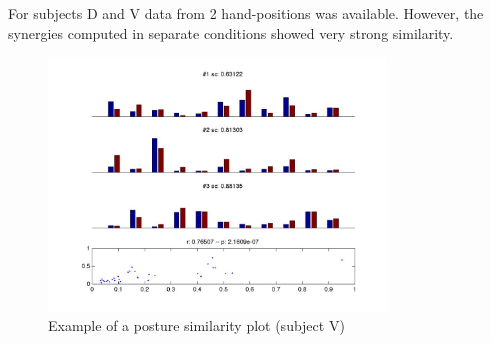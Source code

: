 For subjects D and V data from 2 hand-positions was available. However, the synergies computed in separate conditions showed very strong similarity. 
\begin{figure}[ht]
    \centering
        \includegraphics[width=0.8\textwidth]{images/post_consist_vega.jpg}
    \caption{Example of a posture similarity plot (subject V)}
    \label{sg:fig:images_post_consist_vega}
\end{figure}


